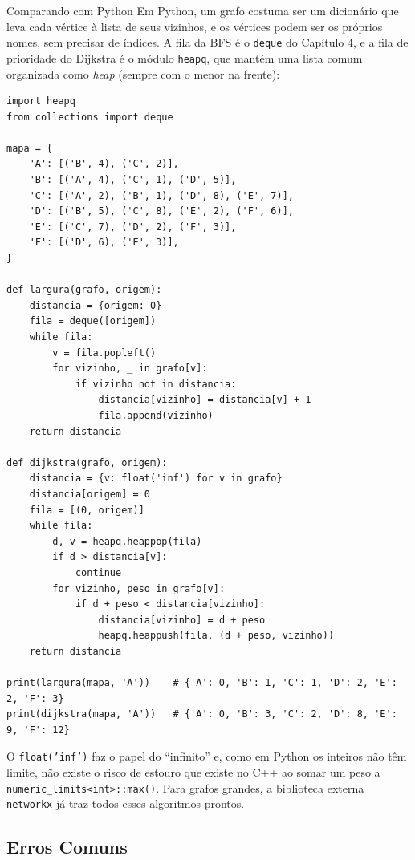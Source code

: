 \begin{destaque}{Comparando com Python}
Em Python, um grafo costuma ser um dicionário que leva cada vértice à lista de seus vizinhos, e os vértices podem ser os próprios nomes, sem precisar de índices. A fila da BFS é o \texttt{deque} do Capítulo 4, e a fila de prioridade do Dijkstra é o módulo \texttt{heapq}, que mantém uma lista comum organizada como \textit{heap} (sempre com o menor na frente):

\begin{codigo}
\begin{Verbatim}[breaklines=true, breaksymbolleft={}, fontsize=\footnotesize]
import heapq
from collections import deque

mapa = {
    'A': [('B', 4), ('C', 2)],
    'B': [('A', 4), ('C', 1), ('D', 5)],
    'C': [('A', 2), ('B', 1), ('D', 8), ('E', 7)],
    'D': [('B', 5), ('C', 8), ('E', 2), ('F', 6)],
    'E': [('C', 7), ('D', 2), ('F', 3)],
    'F': [('D', 6), ('E', 3)],
}

def largura(grafo, origem):
    distancia = {origem: 0}
    fila = deque([origem])
    while fila:
        v = fila.popleft()
        for vizinho, _ in grafo[v]:
            if vizinho not in distancia:
                distancia[vizinho] = distancia[v] + 1
                fila.append(vizinho)
    return distancia

def dijkstra(grafo, origem):
    distancia = {v: float('inf') for v in grafo}
    distancia[origem] = 0
    fila = [(0, origem)]
    while fila:
        d, v = heapq.heappop(fila)
        if d > distancia[v]:
            continue
        for vizinho, peso in grafo[v]:
            if d + peso < distancia[vizinho]:
                distancia[vizinho] = d + peso
                heapq.heappush(fila, (d + peso, vizinho))
    return distancia

print(largura(mapa, 'A'))    # {'A': 0, 'B': 1, 'C': 1, 'D': 2, 'E': 2, 'F': 3}
print(dijkstra(mapa, 'A'))   # {'A': 0, 'B': 3, 'C': 2, 'D': 8, 'E': 9, 'F': 12}
\end{Verbatim}
\end{codigo}

O \texttt{float('inf')} faz o papel do ``infinito'' e, como em Python os inteiros não têm limite, não existe o risco de estouro que existe no C++ ao somar um peso a \texttt{numeric\_limits<int>::max()}. Para grafos grandes, a biblioteca externa \texttt{networkx} já traz todos esses algoritmos prontos.
\end{destaque}

\subsection{Erros Comuns}

